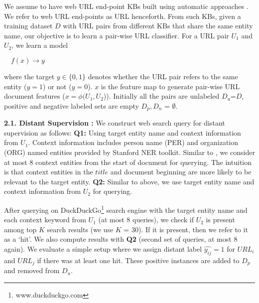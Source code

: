 \documentclass{sig-alternate-05-2015}
\begin{document}
 We assume to have web URL end-point KBs built using automatic approaches \cite{chisholm2016akbc}. We refer to web URL end-points as URL henceforth. From such KBs, given a training dataset $D$ with URL pairs from different KBs that share the same entity name, our objective is to learn a pair-wise URL classifier. For a URL pair $U_{1}$ and $U_{2}$, we learn a model \begin{small} $\quad f(x) \to y$ \end{small} where the target $y \in \{0,1\}$ denotes whether the URL pair refers to the same entity ($y=1$) or not ($y=0$).  $x$ is the feature map to generate pair-wise URL document features ($x=\phi(U_{1}, U_{2}$)). Initially all the pairs are unlabeled $D_{u}$=$D$, positive and negative labeled sets are empty $D_{p}, D_{n}$ = $\emptyset$.

\textbf{2.1. Distant Supervision :} We construct web search query for distant supervision as follows:
\textbf{Q1:} Using target entity name and context information from $U_{1}$. Context information includes person name (PER) and organization (ORG) named entities provided by Stanford NER toolkit.  Similar to \cite{nuray2009exploiting}, we consider at most 8 context entities from the start of document for querying. The intuition is that context entities in the $title$ and document beginning are more likely to be relevant to the target entity. 
\textbf{Q2:} Similar to above, we use target entity name and context information from  $U_{2}$ for querying.

After querying on DuckDuckGo\footnote{www.duckduckgo.com} search engine with the target entity name and each context keyword from $U_{1}$ (at most 8 queries), we check if $U_{2}$ is present among top $K$ search results (we use $K$ = 30). If it is present, then we refer to it as a `hit'. We also compute results with \textbf{Q2} (second set of queries, at most 8 again). We evaluate a simple setup where we assign distant label $\hat{y_{ij}}=1$ for $URL_{i}$ and $URL_{j}$ if there was at least one hit. These positive instances are added to $D_{p}$ and removed from $D_{u}$.

\end{document}
